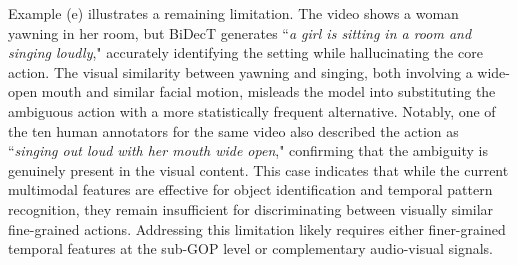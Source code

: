 Example (e) illustrates a remaining limitation. The video shows a woman yawning in her room, but BiDecT generates ``\textit{a girl is sitting in a room and singing loudly}," accurately identifying the setting while hallucinating the core action. The visual similarity between yawning and singing, both involving a wide-open mouth and similar facial motion, misleads the model into substituting the ambiguous action with a more statistically frequent alternative. Notably, one of the ten human annotators for the same video also described the action as ``\textit{singing out loud with her mouth wide open}," confirming that the ambiguity is genuinely present in the visual content. This case indicates that while the current multimodal features are effective for object identification and temporal pattern recognition, they remain insufficient for discriminating between visually similar fine-grained actions. Addressing this limitation likely requires either finer-grained temporal features at the sub-GOP level or complementary audio-visual signals.
